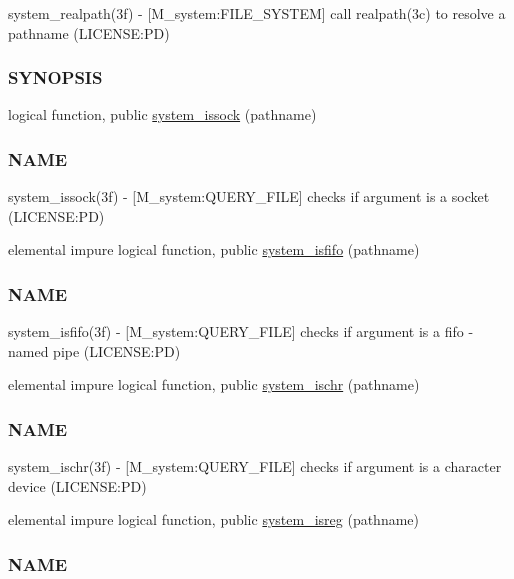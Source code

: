 \begin{DoxyCompactItemize}
\begin{DoxyCompactList}
system\+\_\+realpath(3f) -\/ \mbox{[}M\+\_\+system\+:F\+I\+L\+E\+\_\+\+S\+Y\+S\+T\+EM\mbox{]} call realpath(3c) to resolve a pathname (L\+I\+C\+E\+N\+SE\+:PD) \subsubsection*{S\+Y\+N\+O\+P\+S\+IS}\end{DoxyCompactList}\item 
logical function, public \mbox{\hyperlink{namespacem__system_af6eb5074fe74552bc7a5e7d00f459087}{system\+\_\+issock}} (pathname)
\begin{DoxyCompactList}\small\item\em \subsubsection*{N\+A\+ME}

system\+\_\+issock(3f) -\/ \mbox{[}M\+\_\+system\+:Q\+U\+E\+R\+Y\+\_\+\+F\+I\+LE\mbox{]} checks if argument is a socket (L\+I\+C\+E\+N\+SE\+:PD) \end{DoxyCompactList}\item 
elemental impure logical function, public \mbox{\hyperlink{namespacem__system_aa2bdb5f75405d87934c10756b539d082}{system\+\_\+isfifo}} (pathname)
\begin{DoxyCompactList}\small\item\em \subsubsection*{N\+A\+ME}

system\+\_\+isfifo(3f) -\/ \mbox{[}M\+\_\+system\+:Q\+U\+E\+R\+Y\+\_\+\+F\+I\+LE\mbox{]} checks if argument is a fifo -\/ named pipe (L\+I\+C\+E\+N\+SE\+:PD) \end{DoxyCompactList}\item 
elemental impure logical function, public \mbox{\hyperlink{namespacem__system_a49f1d027d438aab86024660b0802768f}{system\+\_\+ischr}} (pathname)
\begin{DoxyCompactList}\small\item\em \subsubsection*{N\+A\+ME}

system\+\_\+ischr(3f) -\/ \mbox{[}M\+\_\+system\+:Q\+U\+E\+R\+Y\+\_\+\+F\+I\+LE\mbox{]} checks if argument is a character device (L\+I\+C\+E\+N\+SE\+:PD) \end{DoxyCompactList}\item 
elemental impure logical function, public \mbox{\hyperlink{namespacem__system_a8ea0d0430227af61b8083b4e7d6e597d}{system\+\_\+isreg}} (pathname)
\begin{DoxyCompactList}\small\item\em \subsubsection*{N\+A\+ME}


\end{DoxyCompactList}
\end{DoxyCompactItemize}
